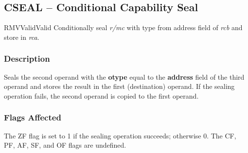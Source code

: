 \clearpage
{}
{}
\subsection*{CSEAL -- Conditional Capability Seal}

\begin{x86opcodetable}
  {RMV}{Valid}{Valid}
  {Conditionally seal \emph{r/mc} with type from address field of
    \emph{rcb} and store in \emph{rca}.}
\end{x86opcodetable}

\begin{x86opentable}
\end{x86opentable}

\subsubsection*{Description}

Seals the second operand with the \textbf{otype} equal to the
\textbf{address} field of the third operand and stores the result in
the first (destination) operand.  If the sealing operation fails, the
second operand is copied to the first operand.

\subsubsection*{Flags Affected}

The ZF flag is set to 1 if the sealing operation succeeds; otherwise
0.  The CF, PF, AF, SF, and OF flags are undefined.
